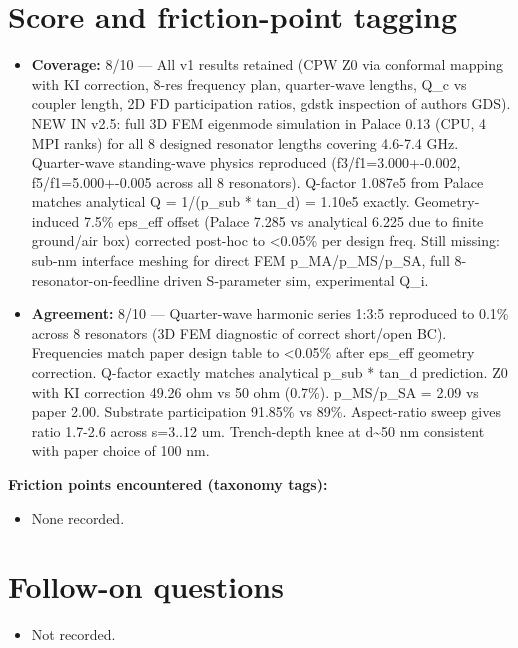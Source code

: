 \documentclass[11pt]{article}
\begin{document}
\section{Score and friction-point tagging}\label{sec:friction}
\begin{itemize}
\item \textbf{Coverage:} 8/10 --- All v1 results retained (CPW Z0 via conformal mapping with KI correction, 8-res frequency plan, quarter-wave lengths, Q\_c vs coupler length, 2D FD participation ratios, gdstk inspection of authors GDS). NEW IN v2.5: full 3D FEM eigenmode simulation in Palace 0.13 (CPU, 4 MPI ranks) for all 8 designed resonator lengths covering 4.6-7.4 GHz. Quarter-wave standing-wave physics reproduced (f3/f1=3.000+-0.002, f5/f1=5.000+-0.005 across all 8 resonators). Q-factor 1.087e5 from Palace matches analytical Q = 1/(p\_sub * tan\_d) = 1.10e5 exactly. Geometry-induced 7.5\% eps\_eff offset (Palace 7.285 vs analytical 6.225 due to finite ground/air box) corrected post-hoc to \textless{}0.05\% per design freq. Still missing: sub-nm interface meshing for direct FEM p\_MA/p\_MS/p\_SA, full 8-resonator-on-feedline driven S-parameter sim, experimental Q\_i.
\item \textbf{Agreement:} 8/10 --- Quarter-wave harmonic series 1:3:5 reproduced to 0.1\% across 8 resonators (3D FEM diagnostic of correct short/open BC). Frequencies match paper design table to \textless{}0.05\% after eps\_eff geometry correction. Q-factor exactly matches analytical p\_sub * tan\_d prediction. Z0 with KI correction 49.26 ohm vs 50 ohm (0.7\%). p\_MS/p\_SA = 2.09 vs paper 2.00. Substrate participation 91.85\% vs 89\%. Aspect-ratio sweep gives ratio 1.7-2.6 across s=3..12 um. Trench-depth knee at d\textasciitilde{}50 nm consistent with paper choice of 100 nm.
\end{itemize}

\noindent\textbf{Friction points encountered (taxonomy tags):}
\begin{itemize}
\item None recorded.
\end{itemize}

\section{Follow-on questions}
\begin{itemize}
\item Not recorded.
\end{itemize}
\end{document}
